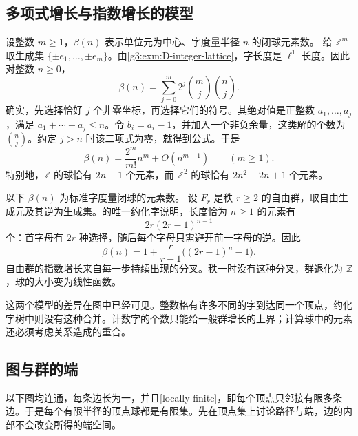\subsection{多项式增长与指数增长的模型}
\label{g3:subsec:D02:02}

\begin{example}\label{g3:exm:D-lattice-growth}
	设整数 \(m\ge1\)，\(\beta(n)\) 表示单位元为中心、字度量半径 \(n\) 的闭球元素数。
	给 \(\mathbb Z^m\) 取生成集 \(\{\pm e_1,\ldots,\pm e_m\}\)。由\cref{g3:exm:D-integer-lattice}，字长度是 \(\ell^1\) 长度。因此对整数 \(n\ge0\)，
	\begin{equation}\label{g3:eq:D-lattice-ball-count}
		\beta(n)=\sum_{j=0}^{m}2^j\binom mj\binom nj.
	\end{equation}
	确实，先选择恰好 \(j\) 个非零坐标，再选择它们的符号。其绝对值是正整数 \(a_1,\ldots,a_j\)，满足 \(a_1+\cdots+a_j\le n\)。令 \(b_i=a_i-1\)，并加入一个非负余量，这类解的个数为 \(\binom nj\)。约定 \(j>n\) 时该二项式为零，就得到公式。于是
	\[
		\beta(n)=\frac{2^m}{m!}n^m+O(n^{m-1})\qquad(m\ge1).
	\]
	特别地，\(\mathbb Z\) 的球恰有 \(2n+1\) 个元素，而 \(\mathbb Z^2\) 的球恰有 \(2n^2+2n+1\) 个元素。
\end{example}

\begin{example}\label{g3:exm:D-free-growth}
	以下 \(\beta(n)\) 为标准字度量闭球的元素数。
	设 \(F_r\) 是秩 \(r\ge2\) 的自由群，取自由生成元及其逆为生成集。的唯一约化字说明，长度恰为 \(n\ge1\) 的元素有
	\[
		2r(2r-1)^{n-1}
	\]
	个：首字母有 \(2r\) 种选择，随后每个字母只需避开前一字母的逆。因此
	\[
		\beta(n)=1+\frac{r}{r-1}\bigl((2r-1)^n-1\bigr).
	\]
	自由群的指数增长来自每一步持续出现的分叉。秩一时没有这种分叉，群退化为 \(\mathbb Z\)，球的大小变为线性函数。
\end{example}

这两个模型的差异在图中已经可见。整数格有许多不同的字到达同一个顶点，约化字树中则没有这种合并。计数字的个数只能给一般群增长的上界；计算球中的元素还必须考虑关系造成的重合。

\subsection{图与群的端}
\label{g3:subsec:D02:03}

以下图均连通，每条边长为一，并且[locally finite]，即每个顶点只邻接有限多条边。于是每个有限半径的顶点球都是有限集。先在顶点集上讨论路径与端，边的内部不会改变所得的端空间。

